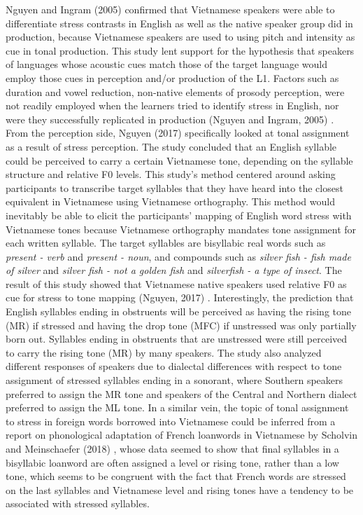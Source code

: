 \documentclass[a4paper]{article}
\begin{document}
Nguyen and Ingram (2005) \cite{Nguyen:2005aa} confirmed that Vietnamese speakers were able to differentiate stress contrasts in English as well as the native speaker group did in production, because Vietnamese speakers are used to using pitch and intensity as cue in tonal production. This study lent support for the hypothesis that speakers of languages whose acoustic cues match those of the target language would employ those cues in perception and/or production of the L1. Factors such as duration and vowel reduction, non-native elements of prosody perception, were not readily employed when the learners tried to identify stress in English, nor were they successfully replicated in production (Nguyen and Ingram, 2005) \cite{Nguyen:2005aa}. From the perception side, Nguyen (2017) specifically looked at tonal assignment as a result of stress perception. The study concluded that an English syllable could be perceived to carry a certain Vietnamese tone, depending on the syllable structure and relative F0 levels. This study's method centered around asking participants to transcribe target syllables that they have heard into the closest equivalent in Vietnamese using Vietnamese orthography. This method would inevitably be able to elicit the participants' mapping of English word stress with Vietnamese tones because Vietnamese orthography mandates tone assignment for each written syllable. The target syllables are bisyllabic real words such as \textit{present - verb} and \textit{present - noun}, and compounds such as \textit{silver fish - fish made of silver} and \textit{silver fish - not a golden fish} and \textit{silverfish - a type of insect}. The result of this study showed that Vietnamese native speakers used relative F0 as cue for stress to tone mapping (Nguyen, 2017) \cite{Nguyen:2017aa}. Interestingly, the prediction that English syllables ending in obstruents will be perceived as having the rising tone (MR) if stressed and having the drop tone (MFC) if unstressed was only partially born out. Syllables ending in obstruents that are unstressed were still perceived to carry the rising tone (MR) by many speakers. The study also analyzed different responses of speakers due to dialectal differences with respect to tone assignment of stressed syllables ending in a sonorant, where Southern speakers preferred to assign the MR tone and speakers of the Central and Northern dialect preferred to assign the ML tone. In a similar vein, the topic of tonal assignment to stress in foreign words borrowed into Vietnamese could be inferred from a report on phonological adaptation of French loanwords in Vietnamese by Scholvin and Meinschaefer (2018) \cite{Scholvin:2018aa}, whose data seemed to show that final syllables in a bisyllabic loanword are often assigned a level or rising tone, rather than a low tone, which seems to be congruent with the fact that French words are stressed on the last syllables and Vietnamese level and rising tones have a tendency to be associated with stressed syllables.
\end{document}
